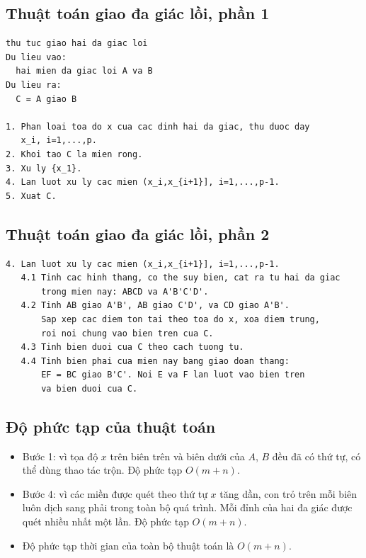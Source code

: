 \documentclass[11pt]{article}
\begin{document}
\subsection*{Thuật toán giao đa giác lồi, phần 1}

\begin{verbatim}
thu tuc giao hai da giac loi
Du lieu vao:
  hai mien da giac loi A va B
Du lieu ra:
  C = A giao B

1. Phan loai toa do x cua cac dinh hai da giac, thu duoc day
   x_i, i=1,...,p.
2. Khoi tao C la mien rong.
3. Xu ly {x_1}.
4. Lan luot xu ly cac mien (x_i,x_{i+1}], i=1,...,p-1.
5. Xuat C.
\end{verbatim}

\subsection*{Thuật toán giao đa giác lồi, phần 2}

\begin{verbatim}
4. Lan luot xu ly cac mien (x_i,x_{i+1}], i=1,...,p-1.
   4.1 Tinh cac hinh thang, co the suy bien, cat ra tu hai da giac
       trong mien nay: ABCD va A'B'C'D'.
   4.2 Tinh AB giao A'B', AB giao C'D', va CD giao A'B'.
       Sap xep cac diem ton tai theo toa do x, xoa diem trung,
       roi noi chung vao bien tren cua C.
   4.3 Tinh bien duoi cua C theo cach tuong tu.
   4.4 Tinh bien phai cua mien nay bang giao doan thang:
       EF = BC giao B'C'. Noi E va F lan luot vao bien tren
       va bien duoi cua C.
\end{verbatim}

\subsection*{Độ phức tạp của thuật toán}

\begin{itemize}
  \item Bước 1: vì tọa độ \(x\) trên biên trên và biên dưới của \(A\), \(B\)
  đều đã có thứ tự, có thể dùng thao tác trộn. Độ phức tạp \(O(m+n)\).
  \item Bước 4: vì các miền được quét theo thứ tự \(x\) tăng dần, con trỏ
  trên mỗi biên luôn dịch sang phải trong toàn bộ quá trình. Mỗi đỉnh của
  hai đa giác được quét nhiều nhất một lần. Độ phức tạp \(O(m+n)\).
  \item Độ phức tạp thời gian của toàn bộ thuật toán là \(O(m+n)\).
\end{itemize}
\end{document}
